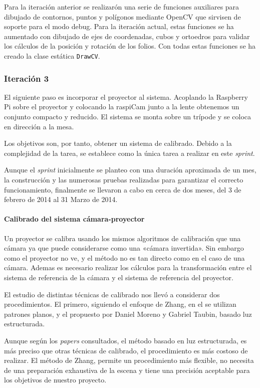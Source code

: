 Para la iteración anterior se realizarón una serie de funciones auxiliares para dibujado de contornos, puntos y polígonos mediante OpenCV que sirvisen de soporte para el modo debug. Para la iteración actual, estas funciones se ha aumentado con dibujado de ejes de coordenadas, cubos y ortoedros para validar los cálculos de la posición y rotación de los folios. Con todas estas funciones se ha creado la clase estática \texttt{DrawCV}. 


\subsubsection{Iteración 3}
El siguiente paso es incorporar el proyector al sistema. Acoplando la Raspberry Pi sobre el proyector y colocando la raspiCam junto a la lente obtenemos un conjunto compacto y reducido. El sistema se monta sobre un trípode y se coloca en dirección a la mesa.

Los objetivos son, por tanto, obtener un sistema de calibrado. Debido a la complejidad de la tarea, se establece como la única tarea a realizar en este \textit{sprint}.

Aunque el \textit{sprint} inicialmente se planteo con una duración aproximada de un mes, la construcción y las numerosas pruebas realizadas para garantizar el correcto funcionamiento, finalmente se llevaron a cabo en cerca de dos meses, del 3 de febrero de 2014 al 31 Marzo de 2014. 

\paragraph{Calibrado del sistema cámara-proyector}
Un proyector se calibra usando los mismos algoritmos de calibración que una cámara ya que puede considerarse como una «cámara invertida». Sin embargo como el proyector no ve, y el método no es tan directo como en el caso de una cámara. Ademas es necesario realizar los cálculos para la transformación entre el sistema de referencia de la cámara y el sistema de referencia del proyector.

El estudio de distintas técnicas de calibrado nos llevó a considerar dos procedimientos. El primero, siguiendo el enfoque de Zhang, en el se utilizan patrones planos, y el propuesto por Daniel Moreno y Gabriel Taubin, basado luz estructurada.

Aunque según los \textit{papers} consultados, el método basado en luz estructurada, es más preciso que otras técnicas de calibrado, el procedimiento es más costoso de realizar. El método de Zhang, permite un procedimiento más flexible, no necesita de una preparación exhaustiva de la escena y tiene una precisión aceptable para los objetivos de nuestro proyecto.

